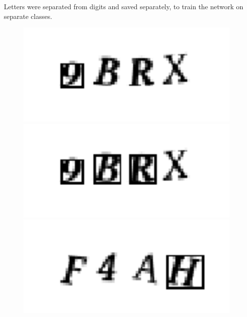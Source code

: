 Letters were separated from digits and saved separately, to train the network on separate classes.

\begin{figure}
	\centering
	\begin{minipage}{0.23\textwidth}
		\centering
		\includegraphics[width=1\textwidth]{boundingbox_1.png}
	\end{minipage}
	\begin{minipage}{0.23\textwidth}
		\centering
		\includegraphics[width=1\textwidth]{boundingbox_2.png} 
		
	\end{minipage}
	\begin{minipage}{0.23\textwidth}
		\centering
		\includegraphics[width=1\textwidth]{boundingbox_3.png} 
		

\end{minipage}
\end{figure}

